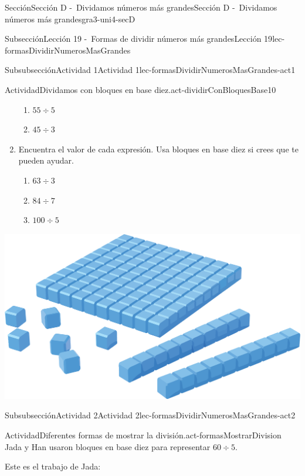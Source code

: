\documentclass[twoside,10pt,]{article}
\begin{document}
\begin{sectionptx}{Sección}{Sección D -~Dividamos números más grandes}{}{Sección D -~Dividamos números más grandes}{}{}{gra3-uni4-secD}
\begin{subsectionptx}{Subsección}{Lección 19 -~Formas de dividir números más grandes}{}{Lección 19}{}{}{lec-formasDividirNumerosMasGrandes}
\begin{subsubsectionptx}{Subsubsección}{Actividad 1}{}{Actividad 1}{}{}{lec-formasDividirNumerosMasGrandes-act1}
\begin{activity}{Actividad}{Dividamos con bloques en base diez.}{act-dividirConBloquesBase10}
\begin{sidebyside}{2}{0}{0}{0.1}
\begin{sbspanel}{0.7}
\begin{enumerate}
\begin{enumerate}
\item{}\(\displaystyle 55 \div 5\)%
\item{}\(\displaystyle 45 \div 3\)%
\end{enumerate}
\item{}Encuentra el valor de cada expresión. Usa bloques en base diez si crees que te pueden ayudar.%
%
\begin{enumerate}
\item{}\(\displaystyle 63 \div 3\)%
\item{}\(\displaystyle 84 \div 7\)%
\item{}\(\displaystyle 100 \div 5\)%
\end{enumerate}
\end{enumerate}
\end{sbspanel}%
\begin{sbspanel}{0.2}%
\includegraphics[width=\linewidth]{external/png-source/CS 3.4 Lesson 19 Activity 1.png}
\end{sbspanel}%
\end{sidebyside}%
\end{activity}%
\end{subsubsectionptx}
%
%
\typeout{************************************************}
\typeout{************************************************}
%
\begin{subsubsectionptx}{Subsubsección}{Actividad 2}{}{Actividad 2}{}{}{lec-formasDividirNumerosMasGrandes-act2}
\begin{activity}{Actividad}{Diferentes formas de mostrar la división.}{act-formasMostrarDivision}%
Jada y Han usaron bloques en base diez para representar \(60 \div 5\).%
\par
Este es el trabajo de Jada:%
\begin{image}{0}{1}{0}{}%

\end{image}
\end{activity}
\end{subsubsectionptx}
\end{subsectionptx}
\end{sectionptx}
\end{document}

